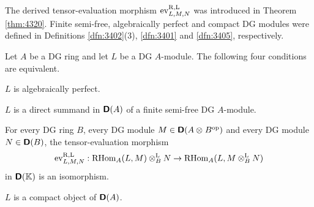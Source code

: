 The derived tensor-evaluation morphism $\operatorname{ev}^{\mathrm{R, L}}_{L, M, N}$ was 
introduced in Theorem \ref{thm:4320}. 
Finite semi-free, algebraically perfect and compact DG modules were defined 
in Definitions \ref{dfn:3402}(3), \ref{dfn:3401} and 
\ref{dfn:3405}, respectively. 

\begin{thm} \label{thm:3400}
Let $A$ be a DG ring and let $L$ be a DG $A$-module. The following four 
conditions are equivalent.
\begin{itemize}
 $L$ is algebraically perfect. 

 $L$ is a direct summand in $\boldsymbol{\mathsf{D}}(A)$ of a finite 
semi-free DG 
$A$-module. 

 For every DG ring $B$, every DG module
$M \in \boldsymbol{\mathsf{D}}(A \otimes_{} B^{\mathrm{op}})$ and every DG module
$N \in \boldsymbol{\mathsf{D}}(B)$, the tensor-evaluation morphism 
\[ \operatorname{ev}^{\mathrm{R, L}}_{L, M, N} : 
\operatorname{RHom}_{A}(L, M) \otimes^{\mathrm{L}}_{B} N \to 
\operatorname{RHom}_{A}(L, M \otimes^{\mathrm{L}}_{B} N) \]
in $\boldsymbol{\mathsf{D}}(\mathbb{K})$ is an isomorphism. 

 $L$ is a compact object of $\boldsymbol{\mathsf{D}}(A)$.
\end{itemize}
\end{thm}

